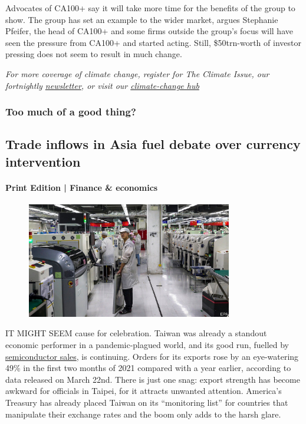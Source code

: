 \documentclass{article}
\begin{document}
Advocates of CA100+ say it will take more time for the benefits of the group to show. The group has set an example to the wider market, argues Stephanie Pfeifer, the head of CA100+ and some firms outside the group's focus will have seen the pressure from CA100+ and started acting. Still, \$50trn-worth of investor pressing does not seem to result in much change. {} 

\emph{For more coverage of climate change, register for The Climate Issue, our fortnightly \href{/theclimateissue/}{newsletter}, or visit our \href{/news/2020/04/24/the-economists-coverage-of-climate-change}{climate-change hub}} 
\clearpage
\subsubsection{Too much of a good thing? }
\subsection{Trade inflows in Asia fuel debate over currency intervention }
\paragraph{Print Edition | Finance \& economics  \quad \color{gray}{Mar 25th 2021 }}
\begin{figure}[h]
\centering
\includegraphics[width=0.8\textwidth]{images/20210327_fnp502.jpg}
\end{figure}
\lettrine{I}T MIGHT SEEM cause for celebration. Taiwan was already a standout economic performer in a pandemic-plagued world, and its good run, fuelled by \href{/the-economist-explains/2021/02/25/why-is-there-a-shortage-of-semiconductors}{semiconductor sales}, is continuing. Orders for its exports rose by an eye-watering 49\% in the first two months of 2021 compared with a year earlier, according to data released on March 22nd. There is just one snag: export strength has become awkward for officials in Taipei, for it attracts unwanted attention. America's Treasury has already placed Taiwan on its ``monitoring list'' for countries that manipulate their exchange rates and the boom only adds to the harsh glare. 
\end{document}
